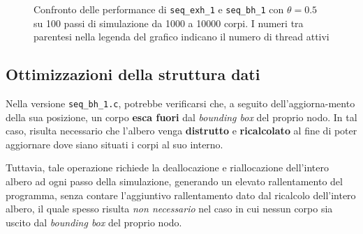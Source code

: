 \documentclass[12pt]{report}
\begin{document}
\begin{figure}[H]

        \caption{Confronto delle performance di \texttt{seq\_exh\_1} e \texttt{seq\_bh\_1} con $\theta = 0.5$ su 100 passi di simulazione da 1000 a 10000 corpi. I numeri tra parentesi nella legenda del grafico indicano il numero di thread attivi}
        \label{fig:seq_1_bh_graph}
    \end{figure}

    \newpage

    \subsection{Ottimizzazioni della struttura dati}

    Nella versione \texttt{seq\_bh\_1.c}, potrebbe verificarsi che, a seguito dell'aggiorna-mento della sua posizione, un corpo \textbf{esca fuori} dal \textit{bounding box} del proprio nodo. In tal caso, risulta necessario che l'albero venga \textbf{distrutto} e \textbf{ricalcolato} al fine di poter aggiornare dove siano situati i corpi al suo interno.

    Tuttavia, tale operazione richiede la deallocazione e riallocazione dell'intero albero ad ogni passo della simulazione, generando un elevato rallentamento del programma, senza contare l'aggiuntivo rallentamento dato dal ricalcolo dell'intero albero, il quale spesso risulta \textit{non necessario} nel caso in cui nessun corpo sia uscito dal \textit{bounding box} del proprio nodo.
\end{document}
